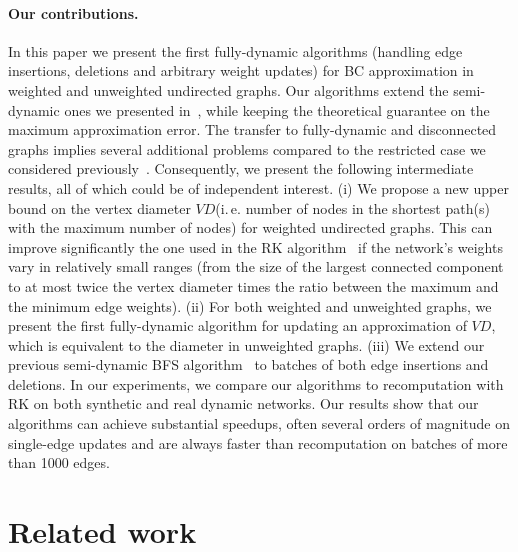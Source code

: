 \documentclass[english]{llncs}
\newcommand{\ie}{i.\,e.\xspace}
\newcommand{\vd}{$\mathit{VD}$\xspace}
\newcommand{\rk}{\textsf{RK}\xspace}
\begin{document}
\paragraph{Our contributions.}
In this paper we present the first fully-dynamic algorithms (handling edge insertions, deletions and arbitrary weight updates) for BC approximation in weighted and unweighted undirected graphs. Our algorithms extend the semi-dynamic ones we presented in~\cite{DBLP:conf/alenex/BergaminiMS15}, while keeping the theoretical guarantee on the maximum approximation error.
The transfer to fully-dynamic and disconnected graphs implies several additional problems compared to the restricted case we considered previously~\cite{DBLP:conf/alenex/BergaminiMS15}.
Consequently, we present the following intermediate results, all of which could be of independent interest.
(i) We propose a new upper bound on the vertex diameter \vd (\ie number of nodes in the shortest path(s) with the maximum number of nodes) for weighted undirected graphs. This can improve significantly the one used in the \rk algorithm~\cite{DBLP:conf/wsdm/RiondatoK14} if the network's weights vary in relatively small ranges (from the size of the largest connected component to at most twice the vertex diameter times the ratio between the maximum and the minimum edge weights).
(ii) For both weighted and unweighted graphs, we present the first fully-dynamic algorithm for updating an approximation of \vd, which is equivalent to the diameter in unweighted graphs.
(iii) We extend our previous semi-dynamic BFS algorithm~\cite{DBLP:conf/alenex/BergaminiMS15} to batches of both edge insertions and deletions.
In our experiments, we compare our algorithms to recomputation with \rk on both synthetic and real dynamic networks. Our results show that our algorithms can achieve substantial speedups, often several orders of magnitude on single-edge updates and are always faster than recomputation on batches of more than 1000 edges. 
\section{Related work}
\label{sec:related_work}
\end{document}
